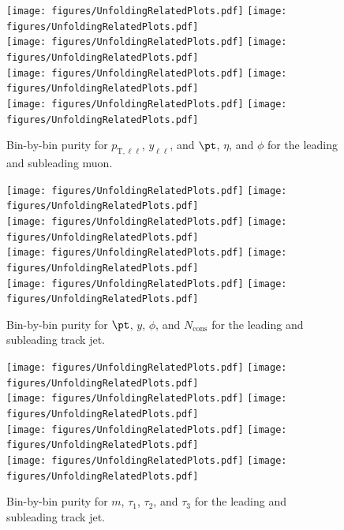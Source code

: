 \begin{figure}[h!]
  \centering
  \texttt{[image: figures/UnfoldingRelatedPlots.pdf]}
  \texttt{[image: figures/UnfoldingRelatedPlots.pdf]} \\
  \texttt{[image: figures/UnfoldingRelatedPlots.pdf]}
  \texttt{[image: figures/UnfoldingRelatedPlots.pdf]} \\
  \texttt{[image: figures/UnfoldingRelatedPlots.pdf]}
  \texttt{[image: figures/UnfoldingRelatedPlots.pdf]} \\
  \texttt{[image: figures/UnfoldingRelatedPlots.pdf]}
  \texttt{[image: figures/UnfoldingRelatedPlots.pdf]}
  \caption{Bin-by-bin purity for $p_{\text{T},\ell\ell}$, $y_{\ell\ell}$, and $\pt$, $\eta$, and $\phi$ for the leading and subleading muon.}
  \label{fig:binPurDilep}
\end{figure}

\begin{figure}[h!]
  \centering
  \texttt{[image: figures/UnfoldingRelatedPlots.pdf]}
  \texttt{[image: figures/UnfoldingRelatedPlots.pdf]} \\
  \texttt{[image: figures/UnfoldingRelatedPlots.pdf]}
  \texttt{[image: figures/UnfoldingRelatedPlots.pdf]} \\
  \texttt{[image: figures/UnfoldingRelatedPlots.pdf]}
  \texttt{[image: figures/UnfoldingRelatedPlots.pdf]} \\
  \texttt{[image: figures/UnfoldingRelatedPlots.pdf]}
  \texttt{[image: figures/UnfoldingRelatedPlots.pdf]}
  \caption{Bin-by-bin purity for $\pt$, $y$, $\phi$, and $N_{\text{cons}}$ for the leading and subleading track jet.}
  \label{fig:binPurTJ1}
\end{figure}

\begin{figure}[h!]
  \centering
  \texttt{[image: figures/UnfoldingRelatedPlots.pdf]}
  \texttt{[image: figures/UnfoldingRelatedPlots.pdf]} \\
  \texttt{[image: figures/UnfoldingRelatedPlots.pdf]}
  \texttt{[image: figures/UnfoldingRelatedPlots.pdf]} \\
  \texttt{[image: figures/UnfoldingRelatedPlots.pdf]}
  \texttt{[image: figures/UnfoldingRelatedPlots.pdf]} \\
  \texttt{[image: figures/UnfoldingRelatedPlots.pdf]}
  \texttt{[image: figures/UnfoldingRelatedPlots.pdf]}
  \caption{Bin-by-bin purity for $m$, $\tau_1$, $\tau_2$, and $\tau_3$ for the leading and subleading track jet.}
  \label{fig:binPurTJ2}
\end{figure}

